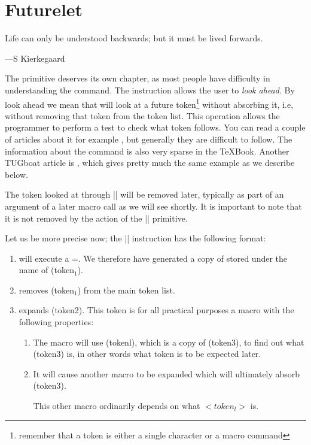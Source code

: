 

\chapter{Futurelet}
\epigraph{Life can only be understood backwards; but it must be lived forwards.}{
---S Kierkegaard}

The  primitive deserves its own chapter, as most people have difficulty in understanding the command. The instruction allows the user to \textit{look ahead}. By look ahead we mean that \tex will look at a future token\footnote{remember that a token is either a single character or a macro command} without absorbing it, i.e, without removing that token from the token list. This operation allows the programmer to perform a test to check what token follows. You can read a couple of articles about it for example \citep{Eijkhout2001}, but generally they are difficult to follow. The information about the command is also very sparse in the \TeX Book.  Another TUGboat article is \citep{bechto88}, which gives pretty much the same example as we describe below. 

The token looked at through
|\futurelet| will be removed later, typically as part
of an argument of a later macro call as we will see shortly. It is important to note that it is not removed by the action of the |\futurelet| primitive.

Let us be more precise now; the |\futurelet|
instruction has the following format:


\begin{commands}[]{}
\cmd{\futurelet} 
\end{commands}


\begin{enumerate}
\item  \tex will execute a \cmd{\let}=.
We therefore have generated a copy of 
stored under the name of (token$_1$).\label{lettoken}

\item  removes (token$_1$) from the main token list.

\item \tex expands (token2). This token is for all
practical purposes a macro with the following
properties:

\begin{enumerate}
\item The macro will use (tokenl), which is a
copy of (token3), to find out what (token3)
is, in other words what token is to be
expected later.
\item It will cause another macro to be expanded
which will ultimately absorb (token3).

This other macro ordinarily depends on
what $<token_l>$ is.
\end{enumerate}
\end{enumerate}

